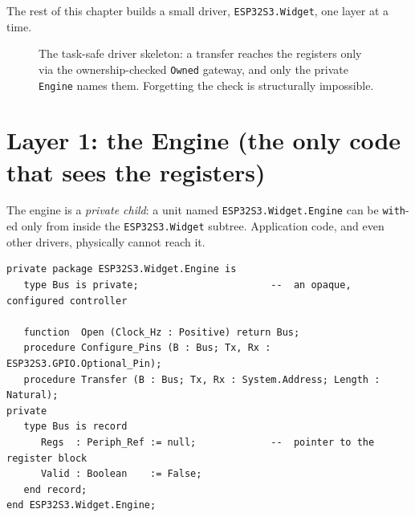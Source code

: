 The rest of this chapter builds a small driver, \texttt{ESP32S3.Widget}, one layer
at a time.

\begin{figure}[ht]
\centering
{}
\caption{The task-safe driver skeleton: a transfer reaches the registers only via
the ownership-checked \texttt{Owned} gateway, and only the private \texttt{Engine}
names them. Forgetting the check is structurally impossible.}
\label{fig:driver-skeleton}
\end{figure}

\section{Layer 1: the Engine (the only code that sees the registers)}

The engine is a \emph{private child}: a unit named \texttt{ESP32S3.Widget.Engine}
can be \texttt{with}-ed only from inside the \texttt{ESP32S3.Widget} subtree.
Application code, and even other drivers, physically cannot reach it.

\begin{lstlisting}
private package ESP32S3.Widget.Engine is
   type Bus is private;                       --  an opaque, configured controller

   function  Open (Clock_Hz : Positive) return Bus;
   procedure Configure_Pins (B : Bus; Tx, Rx : ESP32S3.GPIO.Optional_Pin);
   procedure Transfer (B : Bus; Tx, Rx : System.Address; Length : Natural);
private
   type Bus is record
      Regs  : Periph_Ref := null;             --  pointer to the register block
      Valid : Boolean    := False;
   end record;
end ESP32S3.Widget.Engine;
\end{lstlisting}

